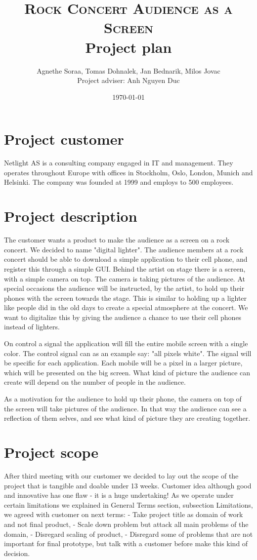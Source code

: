 \documentclass{article}
\title{
    \normalsize \textsc{Rock Concert Audience as a Screen}\\
    \Huge Project plan}
\author{Agnethe Soraa,
Tomas Dohnalek,
Jan Bednarik,
Milos Jovac \\
\normalsize Project adviser: Anh Nguyen Duc}
\date{\today}
\begin{document}
\maketitle
\section{Project customer}
Netlight AS is a consulting company engaged in IT and management. They operates throughout Europe with offices in Stockholm, Oslo, London, Munich and Helsinki. The company was founded at 1999 and employs to 500 employees.

\section{Project description}
The customer wants a product to make the audience as a screen on a rock concert. We decided to name "digital lighter". 
The audience members at a rock concert should be able to download a simple application to their cell phone, and register this through a simple GUI.
Behind the artist on stage there is a screen, with a simple camera on top. The camera is taking pictures of the audience. 
At special occasions the audience will be instructed, by the artist, to hold up their phones with the screen towards the stage.
This is similar to holding up a lighter like people did in the old days to create a special atmosphere at the concert. 
We want to digitalize this by giving the audience a chance to use their cell phones instead of lighters. 

On control a signal the application will fill the entire mobile screen with a single color.
The control signal can as an example say: "all pixels white". The signal will be specific for each application.
Each mobile will be a pixel in a larger picture, which will be presented on the big screen. 
What kind of picture the audience can create will depend on the number of people in the audience.   

As a motivation for the audience to hold up their phone, the camera on top of the screen will take pictures of the audience.
In that way the audience can see a reflection of them selves, and see what kind of picture they are creating together.  

\section{Project scope}

After third meeting with our customer we decided to lay out the scope of the project that is tangible and doable under 13 weeks. Customer idea although good and innovative has one flaw - it is a huge undertaking!
As we operate under certain limitations we explained in General Terms section, subsection Limitations, we agreed with customer on next terms:
 - Take project title as domain of work and not final product,
 - Scale down problem but attack all main problems of the domain,
 - Disregard scaling of product,
 - Disregard some of problems that are not important for final prototype, but talk with a customer before make this kind of decision.
\end{document}
